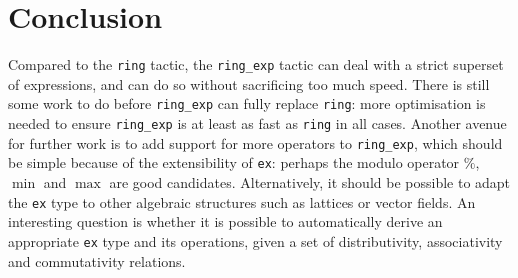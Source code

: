 \documentclass{llncs}
\newcommand{\lean}[1]{\texttt{#1}\xspace} %
\newcommand{\ex}{\lean{ex}}
\newcommand{\ring}{\lean{ring}}
\newcommand{\ringexp}{\lean{ring\_exp}}
\begin{document}
% 

%
%


\section{Conclusion}
Compared to the \ring tactic, the \ringexp tactic can deal with a strict superset of expressions,
and can do so without sacrificing too much speed.
There is still some work to do before \ringexp can fully replace \ring:
more optimisation is needed to ensure \ringexp is at least as fast as \ring in all cases.
Another avenue for further work is to add support for more operators to \ringexp,
which should be simple because of the extensibility of \ex:
perhaps the modulo operator $\%$, $\min$ and $\max$ are good candidates.
Alternatively, it should be possible to adapt the \ex type to other algebraic structures
such as lattices or vector fields.
An interesting question is whether it is possible to automatically derive an appropriate \ex type
and its operations, given a set of distributivity, associativity and commutativity relations.

\printbibliography
\end{document}
